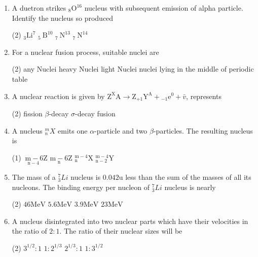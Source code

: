 \begin{enumerate}
\begin{tasks}
		\task[\textbf{D.}]The nuclear force is charge dependent
	\end{tasks}
	\item A duetron strikes ${ }_{8} \mathrm{O}^{16}$ nucleus with subsequent emission of alpha particle. Identify the nucleus so produced
	\begin{tasks}(2)
		\task[\textbf{A.}] ${ }_{3} \mathrm{Li}^{7}$
		\task[\textbf{B.}]  ${ }_{5} \mathrm{~B}^{10}$
		\task[\textbf{C.}]${ }_{7} \mathrm{~N}^{13}$
		\task[\textbf{D.}]${ }_{7} \mathrm{~N}^{14}$
	\end{tasks}
	\item For a nuclear fusion process, suitable nuclei are
	\begin{tasks}(2)
		\task[\textbf{A.}]any Nuclei 
		\task[\textbf{B.}] heavy Nuclei
		\task[\textbf{C.}]light Nuclei
		\task[\textbf{D.}]nuclei lying in the middle of periodic table
	\end{tasks}
	\item A nuclear reaction is given by $\mathrm{Z}^{\mathrm{X}}{\mathrm{A}} \rightarrow \mathrm{Z}_{+1} \mathrm{Y}^{\mathrm{A}}+{ }_{-1} \mathrm{e}^{0}+\bar{v}$, represents
	\begin{tasks}(2)
		\task[\textbf{A.}] fission
		\task[\textbf{B.}] $\beta$-decay
		\task[\textbf{C.}]$\sigma$-decay
		\task[\textbf{D.}]fusion
	\end{tasks}
	\item A nucleus ${ }_{n}^{m} X$ emits one $\alpha$-particle and two $\beta$-particles. The resulting nucleus is
	\begin{tasks}(1)
		\task[\textbf{A.}] $\underset{\mathrm{n}-4}{\mathrm{~m}-6} \mathrm{Z}$
		\task[\textbf{B.}] $\underset{\mathrm{n}}{\mathrm{m}-6} \mathrm{Z}$
		\task[\textbf{C.}]${ }_{\mathrm{n}}^{\mathrm{m}-4} \mathrm{X}$
		\task[\textbf{D.}]${ }_{\mathrm{n}-2}^{\mathrm{m}-4} \mathrm{Y}$
	\end{tasks}
	\item The mass of a ${ }_{3}^{7} L i$ nucleus is $0.042 \mathrm{u}$ less than the sum of the masses of all its nucleons. The binding energy per nucleon of ${ }_{3}^{7} L i$ nucleus is nearly
	\begin{tasks}(2)
		\task[\textbf{A.}]$46 \mathrm{MeV}$
		\task[\textbf{B.}] $5.6 \mathrm{MeV}$
		\task[\textbf{C.}]$3.9 \mathrm{MeV}$
		\task[\textbf{D.}]$23 \mathrm{MeV}$ 
	\end{tasks}		
	\item A nucleus disintegrated into two nuclear parts which have their velocities in the ratio of $2: 1$. The ratio of their nuclear sizes will be
	\begin{tasks}(2)
		\task[\textbf{A.}]  $3^{1 / 2}: 1$
		\task[\textbf{B.}]  $1: 2^{1 / 3}$
		\task[\textbf{C.}]$2^{1 / 3}: 1$
		\task[\textbf{D.}]$1: 3^{1 / 2}$
	\end{tasks}	
\end{enumerate}